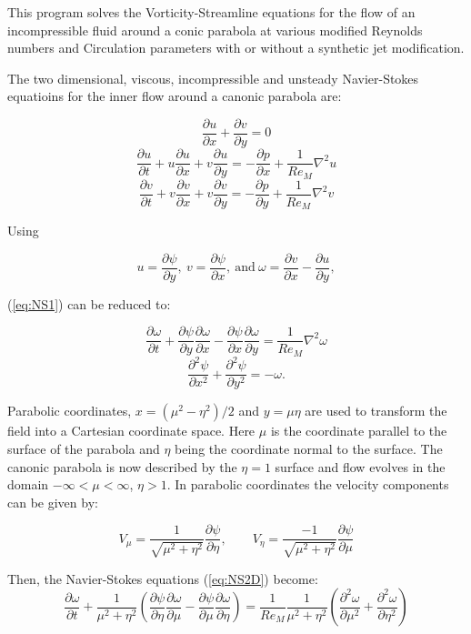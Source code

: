\documentclass{article}
\newcommand{\pd}{\partial}
\begin{document}
This program solves the Vorticity-Streamline equations for the flow of an incompressible fluid around a conic parabola at various modified Reynolds numbers and Circulation parameters with or without a synthetic jet modification.

The two dimensional, viscous, incompressible and unsteady Navier-Stokes equatioins for the inner flow around a canonic parabola are:

\[
\frac{\pd u}{\pd x} + \frac{\pd v}{\pd y} = 0
\]
\[
\frac{\pd u}{\pd t} + u \frac{\pd u}{\pd x} + v \frac{\pd u}{\pd y} = - \frac{\pd p}{\pd x} + \frac{1}{Re_M} \nabla^2 u
\]
\begin{equation}
\label{eq:NS1}
\frac{\pd v}{\pd t} + v \frac{\pd v}{\pd x} + v \frac{\pd v}{\pd y} = - \frac{\pd p}{\pd y} + \frac{1}{Re_M} \nabla^2 v
\end{equation}

Using

\begin{equation}
u=\frac{\pd \psi}{\pd y},\: v=\frac{\pd \psi}{\pd x},\: \mathrm{and}\: \omega=\frac{\pd v}{\pd x} - \frac{\pd u}{\pd y},
\end{equation}

(\ref{eq:NS1}) can be reduced to:

\[
\frac{\pd \omega}{\pd t} + \frac{\pd \psi}{\pd y} \frac{\pd \omega}{\pd x} - \frac{\pd \psi}{\pd x} \frac{\pd \omega}{\pd y} = \frac{1}{Re_M} \nabla^2\omega
\]
\begin{equation}
\frac{\pd^2 \psi}{\pd x^2} + \frac{\pd^2 \psi}{\pd y^2} = -\omega.
\label{eq:NS2D}
\end{equation}

Parabolic coordinates, $x=(\mu^2-\eta^2)/2$ and $y=\mu\eta$ are used to transform the field into a Cartesian coordinate space. Here $\mu$ is the coordinate parallel to the surface of the parabola and $\eta$  being the coordinate normal to the surface. The canonic parabola is now described by the $\eta=1$ surface and flow evolves in the domain $-\infty < \mu < \infty$, $\eta> 1$. In parabolic coordinates the velocity components can be given by:

\[
V_\mu=\frac{1}{\sqrt{\mu^2+\eta^2}} \frac{\pd \psi}{\pd \eta}, \quad\quad
V_\eta=\frac{-1}{\sqrt{\mu^2+\eta^2}} \frac{\pd \psi}{\pd \mu}
\]


Then, the Navier-Stokes equations (\ref{eq:NS2D}) become:
\begin{equation}
\frac{\pd \omega}{\pd t} + \frac{1}{\mu^2 + \eta^2} \left(\frac{\pd \psi}{\pd \eta} \frac{\pd \omega}{\pd \mu} - \frac{\pd \psi}{\pd \mu} \frac{\pd \omega}{\pd \eta} \right) = \frac{1}{Re_M} \frac{1}{\mu^2 + \eta^2} \left(\frac{\pd^2 \omega}{\pd \mu^2} + \frac{\pd^2 \omega}{\pd \eta^2} \right)
\end{equation}
\end{document}
